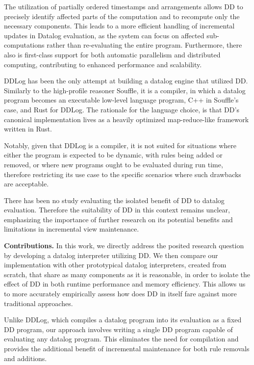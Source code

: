 \documentclass[sigconf,screen,review,natbib]{acmart}
\theoremstyle{definition}
\begin{document}
The utilization of partially ordered timestamps and arrangements allows DD to precisely
identify affected parts of the computation and to recompute only the necessary components. This leads to
a more efficient handling of incremental updates in Datalog evaluation, as the system can focus on affected
sub-computations rather than re-evaluating the entire program. Furthermore, there also is first-class support
for both automatic parallelism and distributed computing, contributing to enhanced performance and scalability.

DDLog\cite{ddlog} has been the only attempt at building a datalog engine that utilized DD.
Similarly to the high-profile reasoner Souffle\cite{souffle}, it is a compiler, in which a datalog program
becomes an executable low-level language program, C++ in Souffle's case, and Rust for DDLog. The rationale for
the language choice, is that DD's canonical implementation lives as a heavily optimized
map-reduce-like framework written in Rust.

Notably, given that DDLog is a compiler, it is not suited for situations where either the program is expected
to be dynamic, with rules being added or removed, or where new programs ought to be evaluated during run
time, therefore restricting its use case to the specific scenarios where such drawbacks are acceptable.

There has been no study evaluating the isolated benefit of DD to datalog evaluation. Therefore
the suitability of DD in this context remains unclear, emphasizing the importance of further
research on its potential benefits and limitations in incremental view maintenance.

\textbf{Contributions.} In this work, we directly address the posited research question by developing a datalog
interpreter utilizing DD. We then compare our implementation with other prototypical datalog
interpreters, created from scratch, that share as many components as it is reasonable, in order to isolate
the effect of DD in both runtime performance and memory efficiency. This allows us to more
accurately empirically assess how does DD in itself fare against more traditional approaches.

Unlike DDLog, which compiles a datalog program into its evaluation as a fixed DD program, our
approach involves writing a single DD program capable of evaluating any datalog program. This
eliminates the need for compilation and provides the additional benefit of incremental maintenance for both rule
removals and additions.
\end{document}
